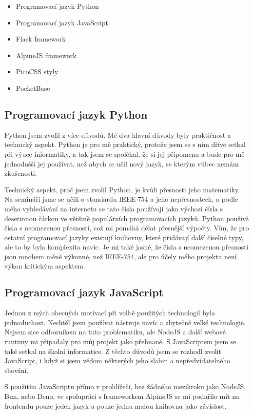 \documentclass[11pt,a4paper,twoside,openright]{report}
\begin{document}
\begin{itemize}
  \item Programovací jazyk Python
  \item Programovací jazyk JavaScript
  \item Flask framework
  \item AlpineJS framework
  \item PicoCSS styly
  \item PocketBase
\end{itemize}

\subsection{Programovací jazyk Python}
Python jsem zvolil z více důvodů. Mé dva hlavní důvody byly praktičnost a technický aspekt. Python je
pro mě praktický, protože jsem se s ním dříve setkal při výuce informatiky, a tak jsem se spoléhal, že
si jej připomenu a bude pro mě jednodušší  jej používat, než abych se učil nový jazyk, se kterým vůbec nemám
zkušenosti.

Technický aspekt, proč jsem zvolil Python, je kvůli přesnosti jeho matematiky. Na semináři jsme se učili o
standardu IEEE-754 a jeho nepřesnostech, a podle mého vyhledávání na internetu se tato čísla používají jako
výchozí čísla s desetinnou čárkou ve většině populárních programovacích jazyků. Python používá čísla s
neomezenou přesností, což mi pomáhá dělat přesnější výpočty. Vím, že pro ostatní programovací jazyky existují
knihovny, které přidávají další číselné typy, ale to by byla komplexita navíc. Je mi také jasné, že čísla
s neomezenou přesností jsou mnohem méně výkonné, než IEEE-754, ale pro účely mého projektu není výkon kritickým
aspektem.

\subsection{Programovací jazyk JavaScript}
Jednou z mých obecných motivací při volbě použitých technologií byla jednoduchost. Nechtěl jsem používat
nástroje navíc a zbytečně velké technologie. Nejsem sice odborníkem na tuto problematiku, ale NodeJS a další
webové runtimy mi připadaly pro můj projekt jako přehnané. S JavaScriptem jsem se také setkal na školní informatice.
Z těchto důvodů jsem se rozhodl zvolit JavaScript, i když si jsem vědom některých jeho slabin a nepředvídatelného
chování.

S použitím JavaScriptu přímo v prohlížeči, bez žádného mezikroku jako NodeJS, Bun, nebo Deno, ve spolupráci
s frameworkem AlpineJS se mi podařilo mít na frontendu pouze jeden jazyk a pouze
jednu malou knihovnu jako závislost.
\end{document}
